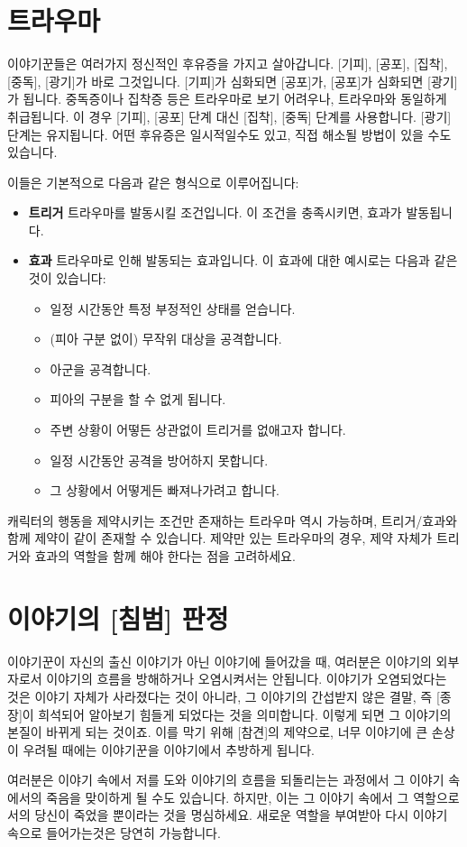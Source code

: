 \documentclass[12pt]{report}
\newcommand{\world}[1]{{\nanumpen \large #1 \par}\bigskip}
\begin{document}
	
	\chapter{트라우마}\label{트라우마}
	이야기꾼들은 여러가지 정신적인 후유증을 가지고 살아갑니다. [기피], [공포], [집착], [중독], [광기]가 바로 그것입니다. [기피]가 심화되면 [공포]가, [공포]가 심화되면 [광기]가 됩니다. 중독증이나 집착증 등은 트라우마로 보기 어려우나, 트라우마와 동일하게 취급됩니다. 이 경우 [기피], [공포] 단계 대신 [집착], [중독] 단계를 사용합니다. [광기] 단계는 유지됩니다. 어떤 후유증은 일시적일수도 있고, 직접 해소될 방법이 있을 수도 있습니다.
	
	이들은 기본적으로 다음과 같은 형식으로 이루어집니다:
	
	\begin{itemize}
	\item \textbf{트리거}
	\subitem 트라우마를 발동시킬 조건입니다. 이 조건을 충족시키면, 효과가 발동됩니다.
	
	\item \textbf{효과}
	\subitem 트라우마로 인해 발동되는 효과입니다. 이 효과에 대한 예시로는 다음과 같은 것이 있습니다:
		\begin{itemize}
			\item 일정 시간동안 특정 부정적인 상태를 얻습니다.
			\item (피아 구분 없이) 무작위 대상을 공격합니다.
			\item 아군을 공격합니다.
			\item 피아의 구분을 할 수 없게 됩니다.
			\item 주변 상황이 어떻든 상관없이 트리거를 없애고자 합니다.
			\item 일정 시간동안 공격을 방어하지 못합니다.
			\item 그 상황에서 어떻게든 빠져나가려고 합니다.
		\end{itemize}
	\end{itemize}
	
	캐릭터의 행동을 제약시키는 조건만 존재하는 트라우마 역시 가능하며, 트리거/효과와 함께 제약이 같이 존재할 수 있습니다. 제약만 있는 트라우마의 경우, 제약 자체가 트리거와 효과의 역할을 함께 해야 한다는 점을 고려하세요.
	
	
	\chapter{이야기의 [침범] 판정}\label{침범_판정}
	\world{이야기꾼이 자신의 출신 이야기가 아닌 이야기에 들어갔을 때, 여러분은 이야기의 외부자로서 이야기의 흐름을 방해하거나 오염시켜서는 안됩니다. 이야기가 오염되었다는 것은 이야기 자체가 사라졌다는 것이 아니라, 그 이야기의 간섭받지 않은 결말, 즉 [종장]이 희석되어 알아보기 힘들게 되었다는 것을 의미합니다. 이렇게 되면 그 이야기의 본질이 바뀌게 되는 것이죠. 이를 막기 위해 [참견]의 제약으로, 너무 이야기에 큰 손상이 우려될 때에는 이야기꾼을 이야기에서 추방하게 됩니다.}
	\world{여러분은 이야기 속에서 저를 도와 이야기의 흐름을 되돌리는는 과정에서 그 이야기 속에서의 죽음을 맞이하게 될 수도 있습니다. 하지만, 이는 그 이야기 속에서 그 역할으로서의 당신이 죽었을 뿐이라는 것을 명심하세요. 새로운 역할을 부여받아 다시 이야기 속으로 들어가는것은 당연히 가능합니다.}
	
\end{document}
